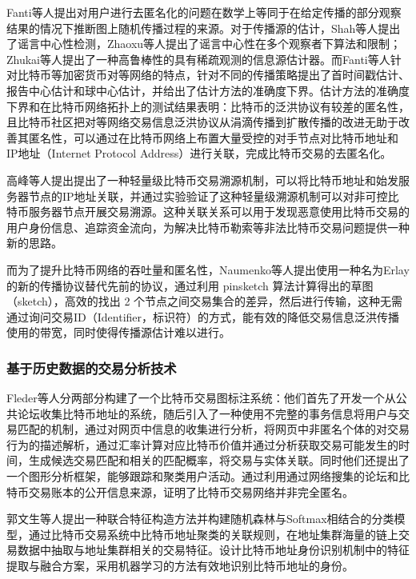 \documentclass[supercite]{HustGraduPaper}
\theoremstyle{definition}
\begin{document}
Fanti\cite{fanti2017anonymity,fanti2017deanonymization}等人提出对用户进行去匿名化的问题在数学上等同于在给定传播的部分观察结果的情况下推断图上随机传播过程的来源。对于传播源的估计，Shah等人提出了谣言中心性检测\cite{shah2012rumor}，Zhaoxu等人提出了谣言中心性在多个观察者下算法和限制\cite{wang2014rumor}；Zhukai等人提出了一种高鲁棒性的具有稀疏观测的信息源估计器\cite{zhu2014robust}。而Fanti等人针对比特币等加密货币对等网络的特点，针对不同的传播策略提出了首时间戳估计、报告中心估计和球中心估计，并给出了估计方法的准确度下界。估计方法的准确度下界和在比特币网络拓扑\cite{miller2015discovering}上的测试结果表明：比特币的泛洪协议有较差的匿名性，且比特币社区把对等网络交易信息泛洪协议从涓滴传播到扩散传播的改进无助于改善其匿名性，可以通过在比特币网络上布置大量受控的对手节点对比特币地址和IP地址（Internet Protocol Address）进行关联，完成比特币交易的去匿名化。

高峰\cite{高峰2018轻量级比特币交易溯源机制}等人提出提出了一种轻量级比特币交易溯源机制，可以将比特币地址和始发服务器节点的IP地址关联，并通过实验验证了这种轻量级溯源机制可以对非可控比特币服务器节点开展交易溯源。这种关联关系可以用于发现恶意使用比特币交易的用户身份信息、追踪资金流向，为解决比特币勒索等非法比特币交易问题提供一种新的思路。


而为了提升比特币网络的吞吐量和匿名性，Naumenko等人提出使用一种名为Erlay\cite{naumenko2019erlay}的新的传播协议替代先前的协议，通过利用 pinsketch 算法\cite{2008Fuzzy}计算得出的草图（sketch），高效的找出 2 个节点之间交易集合的差异，然后进行传输，这种无需通过询问交易ID（Identifier，标识符）的方式，能有效的降低交易信息泛洪传播使用的带宽，同时使得传播源估计难以进行。

\subsubsection{基于历史数据的交易分析技术}

Fleder\cite{fleder2015bitcoin}等人分两部分构建了一个比特币交易图标注系统：他们首先了开发一个从公共论坛收集比特币地址的系统，随后引入了一种使用不完整的事务信息将用户与交易匹配的机制，通过对网页中信息的收集进行分析，将网页中非匿名个体的对交易行为的描述解析，通过汇率计算对应比特币价值并通过分析获取交易可能发生的时间，生成候选交易匹配和相关的匹配概率，将交易与实体关联。同时他们还提出了一个图形分析框架，能够跟踪和聚类用户活动。通过利用通过网络搜集的论坛和比特币交易账本的公开信息来源，证明了比特币交易网络并非完全匿名。

郭文生\cite{郭文生2021基于机器学习的比特币去匿名化方法研究}等人提出一种联合特征构造方法并构建随机森林与Softmax相结合的分类模型，通过比特币交易系统中比特币地址聚类的关联规则，在地址集群海量的链上交易数据中抽取与地址集群相关的交易特征。设计比特币地址身份识别机制中的特征提取与融合方案，采用机器学习的方法有效地识别比特币地址的身份。
\end{document}
